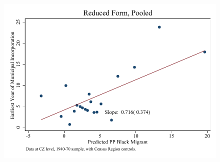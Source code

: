 \documentclass{article}
\begin{document}
\clearpage
\begin{figure}
\centering
\includegraphics{figures/simplefigs/pooled_cgoodman_raw_C3_rf.pdf}
\end{figure}
\clearpage
\end{document}
